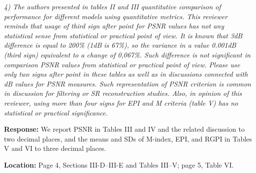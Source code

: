 \documentclass[11pt,letterpaper]{article}
\begin{document}
\textit{4) The authors presented in tables II and III quantitative comparison of performance for different models using quantitative metrics. This reviewer reminds that usage of third sign after point for PSNR values has not any statistical sense from statistical or practical point of view. It is known that 3dB difference is equal to 200\% (1dB is 67\%), so the variance in a value 0.001dB (third sign) equivalent to a change of 0,067\%. Such difference is not significant in comparison PSNR values from statistical or practical point of view. Please use only two signs after point in these tables as well as in discussions connected with dB values for PSNR measures. Such representation of PSNR criterion is common in discussion for filtering or SR reconstruction studies. Also, in opinion of this reviewer, using more than four signs for EPI and M criteria (table V) has no statistical or practical significance.}

\medskip
\textbf{Response:} We report PSNR in Tables III and IV and the related discussion to two decimal places, and the means and SDs of M-index, EPI, and RGPI in Tables V and VI to three decimal places.

\textbf{Location:} Page 4, Sections III-D--III-E and Tables III--V; page 5, Table VI.
\end{document}
